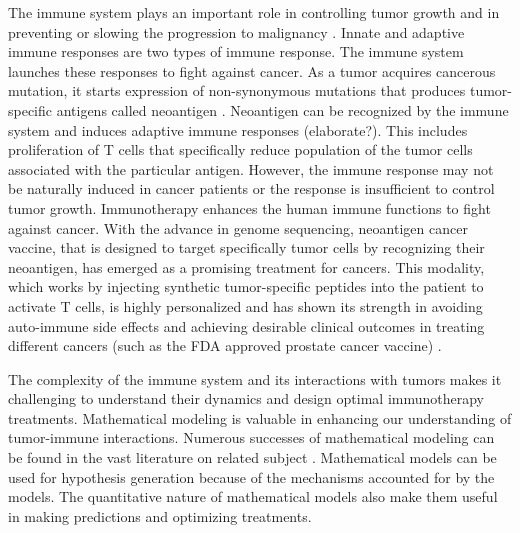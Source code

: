 \documentclass[review,authoryear]{elsarticle}
\begin{document}
The immune system plays an important role in controlling tumor growth
and in preventing or slowing the progression to malignancy \citep{Waldman2020}. Innate and adaptive
immune responses are two types of immune response. The immune system
launches these responses to fight against cancer. As a tumor acquires
cancerous mutation, it starts expression of non-synonymous mutations
that produces tumor-specific antigens called neoantigen \citep{Peng2019}.
Neoantigen can be recognized by the immune system and induces adaptive
immune responses (elaborate?). This includes proliferation of T cells
that specifically reduce population of the tumor cells associated with the particular antigen.
However, the immune response may not be naturally induced in cancer patients or the response is  insufficient to control tumor growth. Immunotherapy enhances the human immune functions to fight
against cancer. With the advance in genome sequencing, neoantigen
cancer vaccine, that is designed to target specifically tumor cells
by recognizing their neoantigen, has emerged as a promising treatment for cancers. This modality, which works by injecting synthetic tumor-specific
peptides into the patient to activate T cells, is
highly personalized and has shown its strength in avoiding auto-immune
side effects \citep{Nelde2021} and achieving desirable clinical outcomes in
treating different cancers (such as the FDA approved prostate cancer vaccine)
\citep[e.g.][]{Ott2017,Pan2018,Peng2019}. 

The complexity of the immune system and its interactions with tumors
makes it challenging to understand their dynamics and design optimal
immunotherapy treatments. Mathematical modeling is valuable in enhancing
our understanding of tumor-immune interactions. Numerous successes
of mathematical modeling can be found in the vast literature on related
subject \citep[e.g., see reviews by][and references therein]{Eftimie2016,Mahlbacher2019,Nukala2021}. Mathematical models can be used for hypothesis
generation because of the mechanisms accounted for by the models. The
quantitative nature of mathematical models also make them useful in making predictions and
optimizing treatments. 
\end{document}
